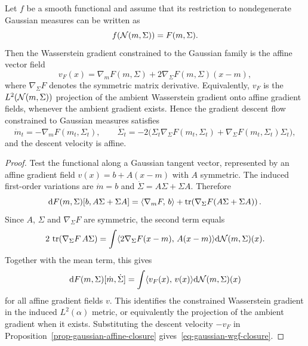 \begin{prop}\label{prop-gaussian-gradient-bullet-list}
	Let $f$ be a smooth functional and assume that its restriction to nondegenerate Gaussian measures can be written as
	\[
		f(\mathcal{N}(m,\Sigma))=F(m,\Sigma).
	\]
	Then the Wasserstein gradient constrained to the Gaussian family is the affine vector field
	\[
		v_F(x)
		=
		\nabla_m F(m,\Sigma)
		+
		2\nabla_\Sigma F(m,\Sigma)(x-m),
	\]
	where $\nabla_\Sigma F$ denotes the symmetric matrix derivative. Equivalently, $v_F$ is the $L^2(\mathcal{N}(m,\Sigma))$ projection of the ambient Wasserstein gradient onto affine gradient fields, whenever the ambient gradient exists. Hence the gradient descent flow constrained to Gaussian measures satisfies
	\begin{equation}\label{eq-gaussian-wgf-closure}
		\dot m_t=-\nabla_m F(m_t,\Sigma_t),
		\qquad
		\dot\Sigma_t=-2\bigl(\Sigma_t\nabla_\Sigma F(m_t,\Sigma_t)+\nabla_\Sigma F(m_t,\Sigma_t)\Sigma_t\bigr),
	\end{equation}
	and the descent velocity is affine.
\end{prop}

\begin{proof}
	Test the functional along a Gaussian tangent vector, represented by an affine gradient field
	\(v(x)=b+A(x-m)\)
	with $A$ symmetric. The induced first-order variations are $\dot m=b$ and $\dot\Sigma=A\Sigma+\Sigma A$. Therefore
	\[
		\mathrm{d} F(m,\Sigma)[b,A\Sigma+\Sigma A]
		=
		\langle \nabla_m F,\,b\rangle
		+
		\operatorname{tr}\!\left(\nabla_\Sigma F(A\Sigma+\Sigma A)\right).
	\]
	Since $A$, $\Sigma$ and $\nabla_\Sigma F$ are symmetric, the second term equals
	\[
		2\,\operatorname{tr}(\nabla_\Sigma F\,A\Sigma)
		=
		\int \langle 2\nabla_\Sigma F(x-m),\,A(x-m)\rangle\mathrm{d}\mathcal{N}(m,\Sigma)(x).
	\]
	Together with the mean term, this gives
	\[
		\mathrm{d} F(m,\Sigma)[\dot m,\dot\Sigma]
		=
		\int \langle v_F(x),\,v(x)\rangle\mathrm{d}\mathcal{N}(m,\Sigma)(x)
	\]
	for all affine gradient fields $v$. This identifies the constrained Wasserstein gradient in the induced $L^2(\alpha)$ metric, or equivalently the projection of the ambient gradient when it exists. Substituting the descent velocity $-v_F$ in Proposition~\ref{prop-gaussian-affine-closure} gives~\eqref{eq-gaussian-wgf-closure}.
\end{proof}

